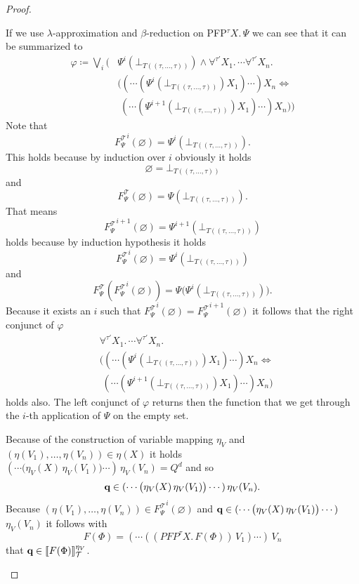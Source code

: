 \begin{proof}
\begin{compactitem}
         If we use $\lambda$-approximation and $\beta$-reduction on PFP$^\tau X.\,\Psi$ we can 
         see that it can be summarized to
         \begin{align*}
         \varphi \coloneqq \underset{i}{\bigvee} \Big(&\Psi^i(\bot_{T((\tau, \dots, \tau))}) \wedge \forall^{\tau'} X_1.\, \dotsb \forall^{\tau'} X_n.\,\\& 
         \big((\dotsb(\Psi^i(\bot_{T((\tau, \dots, \tau))}) X_1)\dotsb)X_n \Leftrightarrow \\&\;(\dotsb(\Psi^{i+1}(\bot_{T((\tau, \dots, \tau))}) X_1)\dotsb)X_n\big)\Big)
         \end{align*}
		Note that 
		\[{F_\Psi^\mathcal{T}}^i(\varnothing) = \Psi^i(\bot_{T((\tau, \dots, \tau))}).\] 
		This holds because by induction over $i$ obviously it holds
		\[\varnothing = \bot_{T((\tau, \dots, \tau))}\] 
		and 
		\[F_\Psi^\mathcal{T}(\varnothing) = \Psi(\bot_{T((\tau, \dots, \tau))}).\] 
		That means 
		\[{F_\Psi^\mathcal{T}}^{i+1}(\varnothing) = \Psi^{i+1}(\bot_{T((\tau, \dots, \tau))})\] 
		holds because by induction hypothesis it holds 
		\[{F_\Psi^\mathcal{T}}^{i}
		(\varnothing) = \Psi^{i}(\bot_{T((\tau, \dots, \tau))})\] 
		and 
		\[F_\Psi^\mathcal{T}({F_\Psi^\mathcal{T}}^{i}(\varnothing))= \Psi\big(\Psi^{i}(\bot_{T((\tau, \dots, \tau))})\big).\]
		Because it exists an $i$ such that ${F_\Psi^\mathcal{T}}^i(\varnothing) = {F_\Psi^		
        \mathcal{T}}^{i+1}(\varnothing)$ it follows that the right conjunct of $\varphi$
		\begin{align*}
		&\forall^{\tau'} X_1.\, \dotsb \forall^{\tau'} X_n.\,\\& 
         \big((\dotsb(\Psi^i(\bot_{T((\tau, \dots, \tau))}) X_1)\dotsb)X_n \Leftrightarrow \\&\;(\dotsb(\Psi^{i+1}(\bot_{T((\tau, \dots, \tau))}) X_1)\dotsb)X_n\big)
         \end{align*}
		holds also. The left conjunct of $\varphi$ returns then the function that we get through  
		the $i$-th application of $\Psi$ on the empty set.
		
		Because of the construction of variable mapping $\eta_V$ and $(\eta(V_1), \dots, \eta(V_n)) 
		\in \eta(X)$ it holds $(\dotsb\big(\eta_V(X)\,\eta_V(V_1)\big) \dotsb )\,\eta_V(V_n) = Q^d$
        and so 
         \[\emph{q} \in (\dotsb\big(\eta_V(X)\,\eta_V(V_1)\big) \dotsb )\,\eta_V(V_n).\]
         Because $(\eta(V_1), \dots, \eta(V_n)) \in {F_\Psi^\mathcal{T}}^i(\varnothing)$ and $
         \emph{q} \in (\dotsb\big(\eta_V(X)\,\eta_V(V_1)\big) \dotsb )\,$ $\eta_V(V_n)$ it follows with 
        \[F(\Phi) = (\dotsb((PFP^\tau X.\, F(\Phi))\, V_1)\dotsb )\, V_n \]
        that $\emph{q} \in \llbracket F(\Phi) \rrbracket_\mathcal{T}^{\eta_V}$.
    \end{compactitem}
\end{proof}

